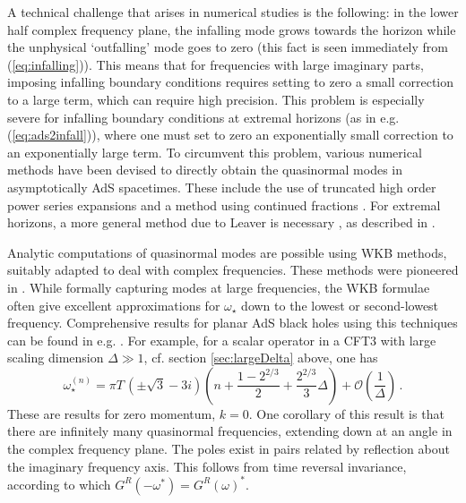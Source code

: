 \documentclass[10pt, oneside]{book}
\def\be{\begin{equation}}
\def\ee{\end{equation}}
\def\ocal{{\mathcal{O}}}
\begin{document}
\begin{doublespace}
A technical challenge that arises in numerical studies is the following: in the lower half complex frequency plane, the infalling mode grows towards the horizon while the unphysical `outfalling' mode goes to zero (this fact is seen immediately from (\ref{eq:infalling})). This means that for frequencies with large imaginary parts, imposing infalling boundary conditions requires setting to zero a small correction to a large term, which can require high precision. This problem is especially severe for infalling boundary conditions at extremal horizons (as in e.g. (\ref{eq:ads2infall})), where one must set to zero an exponentially small correction to an exponentially large term. To circumvent this problem, various numerical methods have been devised to directly obtain the quasinormal modes in asymptotically AdS spacetimes. These include the use of truncated high order power series expansions \cite{Horowitz:1999jd} and a method using continued fractions \cite{Starinets:2002br}. For extremal horizons, a more general method due to Leaver is necessary \cite{PhysRevD.41.2986}, as described in \cite{Denef:2009yy}.

Analytic computations of quasinormal modes are possible using WKB methods, suitably adapted to deal with complex frequencies. These methods were pioneered in \cite{Motl:2003cd}. While formally capturing modes at large frequencies, the WKB formulae often give excellent approximations for $\omega_\star$ down to the lowest or second-lowest frequency. Comprehensive results for planar AdS black holes using this techniques can be found in e.g. \cite{Natario:2004jd,Festuccia:2008zx}. For example, for a scalar operator in a CFT3 with large scaling dimension $\Delta \gg 1$, cf. section \ref{sec:largeDelta} above, one has \cite{Festuccia:2008zx}
\be
\omega_\star^{(n)} = \pi T \, \left(\pm \sqrt{3} - 3 i \right) \left(n + \frac{1 - 2^{2/3}}{2} + \frac{2^{2/3}}{3} \Delta \right) + \ocal \left( \frac{1}{\Delta} \right) \,. \label{eq:qnwkb}
\ee
These are results for zero momentum, $k=0$. One corollary of this result is that there are infinitely many quasinormal frequencies, extending down at an angle in the complex frequency plane. The poles exist in pairs related by reflection about the imaginary frequency axis. This follows from time reversal invariance, according to which $G^R(-\omega^*) = G^R(\omega)^*$.


\end{doublespace}
\end{document}
